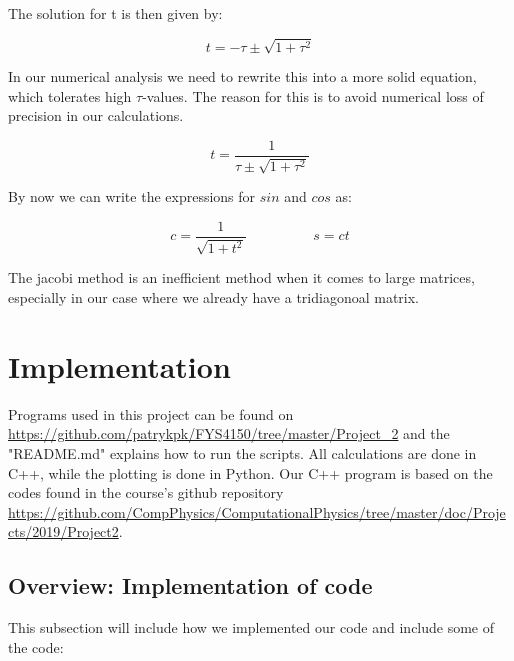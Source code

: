 \documentclass[twoside,onecolumn]{article}
\begin{document}
The solution for t is then given by: 

\begin{equation*}
t  = -\tau \pm \sqrt{1+ \tau^2}
\end{equation*}

In our numerical analysis we need to rewrite this into a more solid equation, which tolerates high $\tau$-values. The reason for this is to avoid numerical loss of precision in our calculations. 

\begin{equation}
t = \frac{1}{\tau \pm  \sqrt{1 +\tau^2}}
\end{equation}

By now we can write the expressions for $sin$ and $cos$ as: 

\begin{equation}
c = \frac{1}{\sqrt{1+t^2}} \hspace{2cm} s = ct
\end{equation}

The jacobi method is an inefficient method when it comes to large matrices, especially in our case where we already have a tridiagonoal matrix.  



\section{Implementation}


Programs used in this project can be found on  \textcolor{red}{\url{https://github.com/patrykpk/FYS4150/tree/master/Project_2}} and the "README.md" explains how to run the scripts. All calculations are done in C++, while the plotting is done in Python. Our C++ program is based on the codes found in the course’s github repository \textcolor{red}{\url{https://github.com/CompPhysics/ComputationalPhysics/tree/master/doc/Projects/2019/Project2}}\cite{Morten}.

\bigskip
\subsection{Overview: Implementation of code}
This subsection will include how we implemented our code and include some of the code: 
\end{document}
